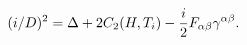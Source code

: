 \begin{equation}
(i\slash D )^2=\Delta  + 2C_2(H,T_i)
-{i\over 2} F_{\alpha\beta}\gamma^{\alpha\beta}.
\label{TorsionHamiltonian2}
\end{equation}


